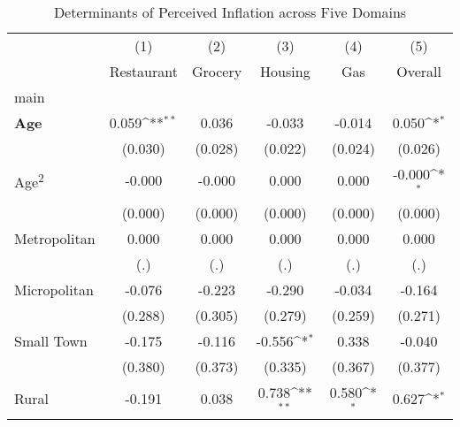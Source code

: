 \begin{table}[htbp]\centering
\def\sym#1{\ifmmode^{#1}\else\(^{#1}\)\fi}
\caption{Determinants of Perceived Inflation across Five Domains}
\begin{tabular}{l*{5}{c}}
\toprule
                    &\multicolumn{1}{c}{(1)}&\multicolumn{1}{c}{(2)}&\multicolumn{1}{c}{(3)}&\multicolumn{1}{c}{(4)}&\multicolumn{1}{c}{(5)}\\
                    &\multicolumn{1}{c}{Restaurant}&\multicolumn{1}{c}{Grocery}&\multicolumn{1}{c}{Housing}&\multicolumn{1}{c}{Gas}&\multicolumn{1}{c}{Overall}\\
\midrule
main                &                     &                     &                     &                     &                     \\
\textbf{Age}        &       0.059\sym{**} &       0.036         &      -0.033         &      -0.014         &       0.050\sym{*}  \\
                    &     (0.030)         &     (0.028)         &     (0.022)         &     (0.024)         &     (0.026)         \\
Age\textsuperscript{2}&      -0.000         &      -0.000         &       0.000         &       0.000         &      -0.000\sym{*}  \\
                    &     (0.000)         &     (0.000)         &     (0.000)         &     (0.000)         &     (0.000)         \\
Metropolitan        &       0.000         &       0.000         &       0.000         &       0.000         &       0.000         \\
                    &         (.)         &         (.)         &         (.)         &         (.)         &         (.)         \\
Micropolitan        &      -0.076         &      -0.223         &      -0.290         &      -0.034         &      -0.164         \\
                    &     (0.288)         &     (0.305)         &     (0.279)         &     (0.259)         &     (0.271)         \\
Small Town          &      -0.175         &      -0.116         &      -0.556\sym{*}  &       0.338         &      -0.040         \\
                    &     (0.380)         &     (0.373)         &     (0.335)         &     (0.367)         &     (0.377)         \\
Rural               &      -0.191         &       0.038         &       0.738\sym{**} &       0.580\sym{*}  &       0.627\sym{*}  \\

\end{tabular}
\end{table}
